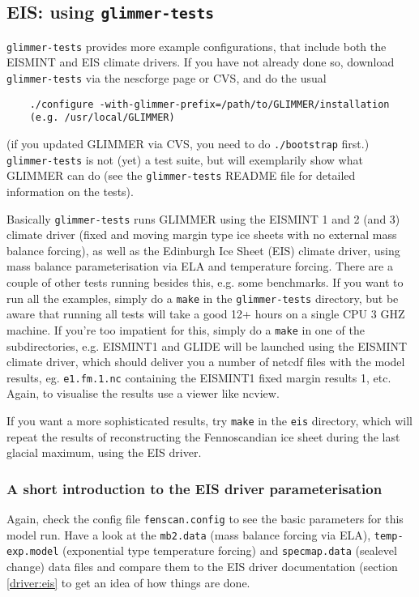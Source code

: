 
\subsection{EIS: using \texttt{glimmer-tests}}
\texttt{glimmer-tests} provides more example configurations, that include both the EISMINT
and EIS climate drivers. If you have not already done so, download
\texttt{glimmer-tests} via the nescforge page or CVS, and do the usual
\begin{verbatim}
    ./configure -with-glimmer-prefix=/path/to/GLIMMER/installation
    (e.g. /usr/local/GLIMMER)
\end{verbatim}
(if you updated GLIMMER via CVS, you need to do \texttt{./bootstrap} first.)\\
\texttt{glimmer-tests} is not (yet) a test suite, but will exemplarily show
what GLIMMER can do (see the \texttt{glimmer-tests} README file for detailed
information on the tests).

Basically \texttt{glimmer-tests} runs GLIMMER using the EISMINT 1 and 2 (and 3)
climate driver (fixed and moving margin type ice sheets with no external mass
balance forcing), as well as the Edinburgh Ice Sheet (EIS) climate driver,
using mass balance parameterisation via ELA and temperature forcing. There are
a couple of other tests running besides this, e.g. some benchmarks. If you want
to run all the examples, simply do a \texttt{make} in the
\texttt{glimmer-tests} directory, but be aware that running all tests will take a good
12+ hours on a single CPU 3 GHZ machine. If you're too impatient for this,
simply do a \texttt{make} in one of the subdirectories, e.g. EISMINT1 and GLIDE
will be launched using the EISMINT climate driver, which should deliver you a
number of netcdf files with the model results, eg. \texttt{e1.fm.1.nc}
containing the EISMINT1 fixed margin results 1, etc. Again, to visualise the
results use a viewer like ncview.

If you want a more sophisticated results, try \texttt{make} in the \texttt{eis}
directory, which will repeat the results of \cite{Hagdorn2003} reconstructing
the Fennoscandian ice sheet during the last glacial maximum, using the EIS
driver.

\subsubsection{A short introduction to the EIS driver parameterisation}

Again, check the config file \texttt{fenscan.config} to see the basic
parameters for this model run. Have a look at the \texttt{mb2.data} (mass
balance forcing via ELA), \texttt{temp-exp.model} (exponential type temperature
forcing) and \texttt{specmap.data} (sealevel change) data files and compare
them to the EIS driver documentation (section \ref{driver:eis} to get an idea of how things are done.


